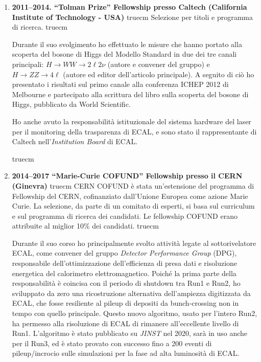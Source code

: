 \documentclass[11pt,twoside,a4paper]{article}
\begin{document}
\begin{enumerate}
Nel corso del suo svolgimento ho svolto l'analisi sui primi dati di
collisione di CMS, che ha prodotto la pubblicazione della sezione
d'urto di produzione inclusiva di bosoni W e Z e differenziale nel
numero di jet associati.

Inoltre ho svolto l'analisi dei dati per la ricerca del bosone di
Higgs H$\to$WW nei canali puramente leptonici: i risultati hanno
portato alla prima esclusione di intervalli di massa intorno a
$m_H\approx$160 GeV con i dati di LHC e le prime evidenze di eccessi
intorno a 125 GeV. Sono stato autore pricincipale dell'articolo,
nonch\'e sono stato convener del gruppo di analisi (``Livello 3'' del
gruppo di fisica dell'Higgs).


 truecm
\item \textbf{2011--2014. ``Tolman Prize'' Fellowship  presso Caltech (California Institute of Technology - USA)}
 truecm
Selezione per titoli e programma di ricerca.
 truecm

Durante il suo svolgimento ho effettuato le misure che hanno portato
alla scoperta del bosone di Higgs del Modello Standard in due dei tre
canali principali: $H \to WW\to 2\ell 2\nu$ (autore e convener del
gruppo) e $H\to ZZ \to 4\ell$ (autore ed editor dell'articolo
principale). A seguito di ci\`o ho presentato i risultati sul primo
canale alla conferenza ICHEP 2012 di Melbourne e partecipato alla
scrittura del libro sulla scoperta del bosone di Higgs, pubblicato da
World Scientific.

Ho anche avuto la responsabilit\`a istituzionale del sistema hardware
del laser per il monitoring della trasparenza di ECAL, e sono stato il
rappresentante di Caltech nell'\textit{Institution Board} di ECAL.


 truecm
\item \textbf{2014--2017 ``Marie-Curie COFUND'' Fellowship presso il CERN (Ginevra)}
 truecm
CERN COFUND \`e stata un'estensione del programma di
Fellowship del CERN, cofinanziato dall'Unione Europea come azione
Marie Curie. La selezione, da parte di un comitato di esperti, si basa
sul curriculum e sul programma di ricerca dei candidati. Le fellowship
COFUND erano attribuite al miglior 10\% dei candidati.
 truecm

Durante il suo corso ho principalmente svolto attivit\`a legate al
sottorivelatore ECAL, come convener del gruppo \textit{Detector
  Performance Group} (DPG), responsabile dell'ottimizzazione
dell'efficienza di presa dati e risoluzione energetica del calorimetro
elettromagnetico. Poich\'e la prima parte della responsabilit\`a \`e
coincisa con il periodo di shutdown tra Run1 e Run2, ho sviluppato da
zero una ricostruzione alternativa dell'ampiezza digitizzata da ECAL,
che fosse resiliente al pileup di depositi da bunch-crossing non in
tempo con quello principale. Questo nuovo algoritmo, usato per
l'intero Run2, ha permesso alla risoluzione di ECAL di rimanere
all'eccellente livello di Run1. L'algoritmo \`e stato pubblicato su
\textit{JINST} nel 2020, sar\`a in uso anche per il Run3, ed \`e stato
provato con successo fino a 200 eventi di pileup/incrocio sulle
simulazioni per la fase ad alta luminosit\`a di ECAL.


\end{enumerate}
\end{document}

